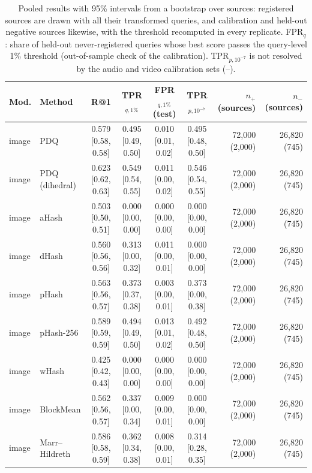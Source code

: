 \begin{table}[!t]
\centering
\scriptsize
\caption{Pooled results with 95\% intervals from a bootstrap over sources: registered sources are drawn with all their transformed queries, and calibration and held-out negative sources likewise, with the threshold recomputed in every replicate. FPR$_q$: share of held-out never-registered queries whose best score passes the query-level 1\% threshold (out-of-sample check of the calibration). TPR$_{p,10^{-7}}$ is not resolved by the audio and video calibration sets (--).}
\label{tab:fp-ci}
\setlength{\tabcolsep}{3pt}
\begin{tabular}{llccccrr}
\toprule
Mod. & Method & R@1 & TPR$_{q,1\%}$ & FPR$_{q,1\%}$ (test) & TPR$_{p,10^{-7}}$ & $n_+$ (sources) & $n_-$ (sources) \\
\midrule
image & PDQ & 0.579 \tiny[0.58, 0.58] & 0.495 \tiny[0.49, 0.50] & 0.010 \tiny[0.01, 0.02] & 0.495 \tiny[0.48, 0.50] & 72{,}000 (2{,}000) & 26{,}820 (745) \\
image & PDQ (dihedral) & 0.623 \tiny[0.62, 0.63] & 0.549 \tiny[0.54, 0.55] & 0.011 \tiny[0.00, 0.02] & 0.546 \tiny[0.54, 0.55] & 72{,}000 (2{,}000) & 26{,}820 (745) \\
image & aHash & 0.503 \tiny[0.50, 0.51] & 0.000 \tiny[0.00, 0.00] & 0.000 \tiny[0.00, 0.00] & 0.000 \tiny[0.00, 0.00] & 72{,}000 (2{,}000) & 26{,}820 (745) \\
image & dHash & 0.560 \tiny[0.56, 0.56] & 0.313 \tiny[0.00, 0.32] & 0.011 \tiny[0.00, 0.01] & 0.000 \tiny[0.00, 0.00] & 72{,}000 (2{,}000) & 26{,}820 (745) \\
image & pHash & 0.563 \tiny[0.56, 0.57] & 0.373 \tiny[0.37, 0.38] & 0.003 \tiny[0.00, 0.01] & 0.373 \tiny[0.00, 0.38] & 72{,}000 (2{,}000) & 26{,}820 (745) \\
image & pHash-256 & 0.589 \tiny[0.59, 0.59] & 0.494 \tiny[0.49, 0.50] & 0.013 \tiny[0.01, 0.02] & 0.492 \tiny[0.48, 0.50] & 72{,}000 (2{,}000) & 26{,}820 (745) \\
image & wHash & 0.425 \tiny[0.42, 0.43] & 0.000 \tiny[0.00, 0.00] & 0.000 \tiny[0.00, 0.00] & 0.000 \tiny[0.00, 0.00] & 72{,}000 (2{,}000) & 26{,}820 (745) \\
image & BlockMean & 0.562 \tiny[0.56, 0.57] & 0.337 \tiny[0.00, 0.34] & 0.009 \tiny[0.00, 0.01] & 0.000 \tiny[0.00, 0.00] & 72{,}000 (2{,}000) & 26{,}820 (745) \\
image & Marr–Hildreth & 0.586 \tiny[0.58, 0.59] & 0.362 \tiny[0.34, 0.38] & 0.008 \tiny[0.00, 0.01] & 0.314 \tiny[0.28, 0.35] & 72{,}000 (2{,}000) & 26{,}820 (745) \\

\end{tabular}
\end{table}

